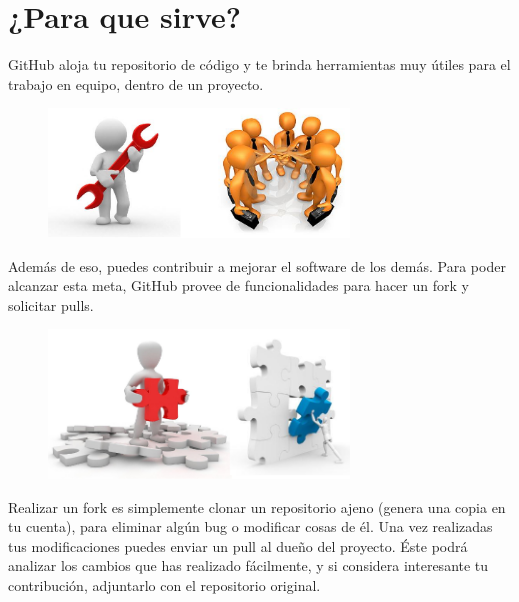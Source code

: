 \documentclass[12pt,letterpaper]{article}
\begin{document}
\section{¿Para que sirve?}
GitHub aloja tu repositorio de código y te brinda herramientas muy útiles para el trabajo en equipo, dentro de un proyecto.

\vspace*{-0.025in}
\begin{figure}[htb]
\begin{center}
\includegraphics[width=8cm]{./Imagenes/herramienta-tee}
\end{center}
\end{figure}

Además de eso, puedes contribuir a mejorar el software de los demás. Para poder alcanzar esta meta, GitHub provee de funcionalidades para hacer un fork y solicitar pulls.

\vspace*{-0.025in}
\begin{figure}[htb]
\begin{center}
\includegraphics[width=8cm]{./Imagenes/colaboracion}
\end{center}
\end{figure}

Realizar un fork es simplemente clonar un repositorio ajeno (genera una copia en tu cuenta), para eliminar algún bug o modificar cosas de él. Una vez realizadas tus modificaciones puedes enviar un pull al dueño del proyecto. Éste podrá analizar los cambios que has realizado fácilmente, y si considera interesante tu contribución, adjuntarlo con el repositorio original.

\vspace*{-0.025in}
\end{document}
